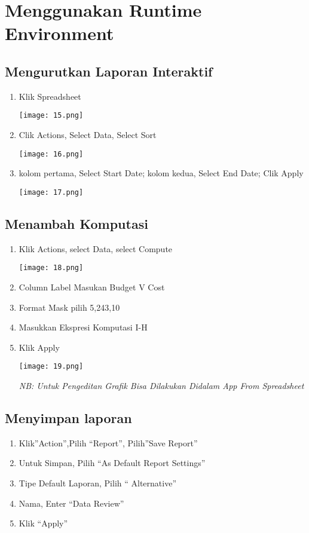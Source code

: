 \documentclass[a4paper,12pt]{report}
\begin{document}
\section{Menggunakan Runtime Environment}
\subsection{Mengurutkan Laporan Interaktif}
\begin{enumerate}
    \item Klik Spreadsheet
    \begin{center}
    \texttt{[image: 15.png]}
    \end{center}
    \item Clik Actions, Select Data, Select Sort
    \begin{center}
    \texttt{[image: 16.png]}
    \end{center}
    \item kolom pertama, Select Start Date; kolom kedua, Select End Date; Clik Apply
    \begin{center}
    \texttt{[image: 17.png]}
    \end{center}
\end{enumerate}
\subsection{Menambah Komputasi}
\begin{enumerate}
    \item Klik Actions, select Data, select Compute
    \begin{center}
    \texttt{[image: 18.png]}
    \end{center}
    \item Column Label Masukan Budget V Cost
    \item Format Mask pilih 5,243,10
    \item Masukkan Ekspresi Komputasi I-H
    \item Klik Apply
    \begin{center}
    \texttt{[image: 19.png]}
    \end{center}
\textit {NB: Untuk Pengeditan Grafik Bisa Dilakukan Didalam App From Spreadsheet}
\end{enumerate}
\subsection{Menyimpan laporan}
\begin{enumerate}
    \item Klik”Action”,Pilih “Report”, Pilih”Save Report”
    \item Untuk Simpan, Pilih “As Default Report Settings”
    \item  Tipe Default Laporan, Pilih “ Alternative”
    \item Nama, Enter “Data Review”
    \item Klik “Apply”
\end{enumerate}
\end{document}
